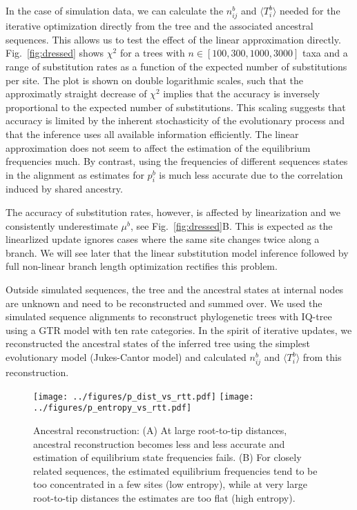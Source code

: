 \documentclass[aps,rmp, onecolumn]{revtex4}
\newcommand{\eqp}{p}
\begin{document}
In the case of simulation data, we can calculate the $n^b_{ij}$ and $\langle T_i^b\rangle$ needed for the iterative optimization directly from the tree and the associated ancestral sequences.
This allows us to test the effect of the linear approximation directly.
Fig.~\ref{fig:dressed} shows $\chi^2$ for a trees with $n\in [100,300,1000,3000]$ taxa and a range of substitution rates as a function of the expected number of substitutions per site.
The plot is shown on double logarithmic scales, such that the approximatly straight decrease of $\chi^2$ implies that the accuracy is inversely proportional to the expected number of substitutions.
This scaling suggests that accuracy is limited by the inherent stochasticity of the evolutionary process and that the inference uses all available information efficiently.
The linear approximation does not seem to affect the estimation of the equilibrium frequencies much.
By contrast, using the frequencies of different sequences states in the alignment as estimates for $\eqp_i^b$ is much less accurate due to the correlation induced by shared ancestry.

The accuracy of substitution rates, however, is affected by linearization and we consistently underestimate $\mu^b$, see Fig.~\ref{fig:dressed}B.
This is expected as the linearlized update ignores cases where the same site changes twice along a branch.
We will see later that the linear substitution model inference followed by full non-linear branch length optimization rectifies this problem.

Outside simulated sequences, the tree and the ancestral states at internal nodes are unknown and need to be reconstructed and summed over.
We used the simulated sequence alignments to reconstruct phylogenetic trees with IQ-tree \citep{nguyen_iq-tree:_2015} using a GTR model with ten rate categories.
In the spirit of iterative updates, we reconstructed the ancestral states of the inferred tree using the simplest evolutionary model (Jukes-Cantor model) and calculated $n^b_{ij}$ and $\langle T_i^b\rangle$ from this reconstruction.


\begin{figure}[tb]
	\centering
	\texttt{[image: ../figures/p\_dist\_vs\_rtt.pdf]}
	\texttt{[image: ../figures/p\_entropy\_vs\_rtt.pdf]}
	\caption{Ancestral reconstruction: (A) At large root-to-tip distances, ancestral reconstruction becomes less and less accurate and estimation of equilibrium state frequencies fails. (B) For closely related sequences, the estimated equilibrium frequencies tend to be too concentrated in a few sites (low entropy), while at very large root-to-tip distances the estimates are too flat (high entropy). }
	\label{fig:reconstructed}
\end{figure}
\end{document}
